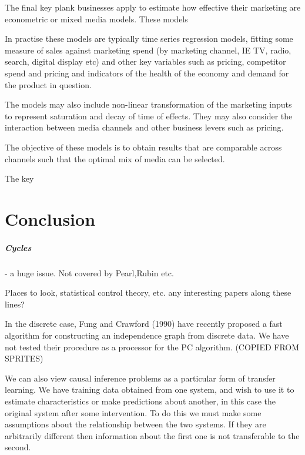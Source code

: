 The final key plank businesses apply to estimate how effective their marketing are econometric or mixed media models. These models

In practise these models are typically time series regression models, fitting some measure of sales against marketing spend (by marketing channel, IE TV, radio, search, digital display etc) and other key variables such as pricing, competitor spend and pricing and indicators of the health of the economy and demand for the product in question.

The models may also include non-linear transformation of the marketing inputs to represent saturation and decay of time of effects. They may also consider the interaction between media channels and other business levers such as pricing.  

The objective of these models is to obtain results that are comparable across channels such that the optimal mix of media can be selected. 

The key

\chapter{Conclusion}

\paragraph{Cycles} - a huge issue. Not covered by Pearl,Rubin etc. 

Places to look, statistical control theory, etc. any interesting papers along these lines?

In the discrete case,
Fung and Crawford (1990) have recently proposed a fast algorithm for constructing an
independence graph from discrete data. We have not tested their procedure as a processor for
the PC algorithm. (COPIED FROM SPRITES)


We can also view causal inference problems as a particular form of transfer learning. We have training data obtained from one system, and wish to use it to estimate characteristics or make predictions about another, in this case the original system after some intervention. To do this we must make some assumptions about the relationship between the two systems. If they are arbitrarily different then information about the first one is not transferable to the second. 


